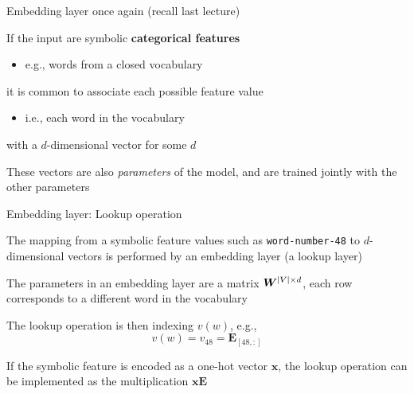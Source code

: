 \documentclass[12pt,aspectratio=169,handout]{beamer}
\begin{document}
\begin{frame}{Embedding layer once again (recall last lecture)}

If the input are symbolic \textbf{categorical features}
\begin{itemize}
	\item e.g., words from a closed vocabulary
\end{itemize}
it is common to associate each possible feature value
\begin{itemize}
	\item i.e., each word in the vocabulary
\end{itemize}
with a $d$-dimensional vector for some $d$

\bigskip

These vectors are also \emph{parameters} of the model, and are trained jointly with the other parameters

\end{frame}

\begin{frame}{Embedding layer: Lookup operation}
	
The mapping from a symbolic feature values such as \texttt{word-number-48} to $d$-dimensional vectors is performed by an embedding layer (a lookup layer)

The parameters in an embedding layer are a matrix $\bm{W}^{\abs{V} \times d}$, each row corresponds to a different word in the vocabulary

The lookup operation is then indexing $v(w)$, e.g.,
$$v(w) = v_{48} = \bm{E}_{[48,:]}$$

If the symbolic feature is encoded as a one-hot vector $\bm{x}$, the lookup operation can be implemented as the multiplication $\bm{x} \bm{E}$
	
\end{frame}
\end{document}
